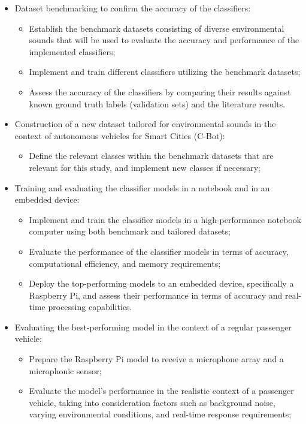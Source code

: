\begin{itemize}
    \item Dataset benchmarking to confirm the accuracy of the classifiers:
    \begin{itemize}
        \item Establish the benchmark datasets consisting of diverse environmental sounds that will be used to evaluate the accuracy and performance of the implemented classifiers;
        \item Implement and train different classifiers utilizing the benchmark datasets;
        \item Assess the accuracy of the classifiers by comparing their results against known ground truth labels (validation sets) and the literature results.
    \end{itemize}
    \item Construction of a new dataset tailored for environmental sounds in the  context of autonomous vehicles for Smart Cities (C-Bot):
    \begin{itemize}
        \item Define the relevant classes within the benchmark datasets that are relevant for this study, and implement new classes if necessary;
    \end{itemize}
    \item Training and evaluating the classifier models in a notebook and in an embedded device:
    \begin{itemize}
        \item Implement and train the classifier models in a high-performance notebook computer using both benchmark and tailored datasets;
        \item Evaluate the performance of the classifier models in terms of accuracy, computational efficiency, and memory requirements;
        \item Deploy the top-performing models to an embedded device, specifically a Raspberry Pi, and assess their performance in terms of accuracy and real-time processing capabilities.
    \end{itemize}
    \item Evaluating the best-performing model in the context of a regular passenger vehicle:
    \begin{itemize}
        \item Prepare the Raspberry Pi model to receive a microphone array and a microphonic sensor;
        \item Evaluate the model's performance in the realistic context of a passenger vehicle, taking into consideration factors such as background noise, varying environmental conditions, and real-time response requirements;
    \end{itemize}
\end{itemize}


